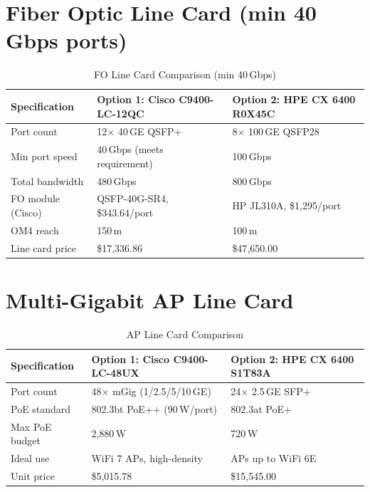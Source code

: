 \documentclass[12pt,a4paper]{report}
\begin{document}
\section{Fiber Optic Line Card (min 40\,Gbps ports)}

\begin{table}[H]
  \centering
  \caption{FO Line Card Comparison (min 40\,Gbps)}
  \label{tab:fo_lc_compare}
  \begin{tabular}{L{3.8cm} L{5.2cm} L{5.2cm}}
    \toprule
    \textbf{Specification} & \textbf{Option 1: Cisco C9400-LC-12QC} & \textbf{Option 2: HPE CX 6400 R0X45C} \\
    \midrule
    Port count             & 12$\times$ 40\,GE QSFP+           & 8$\times$ 100\,GE QSFP28 \\
    Min port speed         & 40\,Gbps (meets requirement)       & 100\,Gbps \\
    Total bandwidth        & 480\,Gbps                          & 800\,Gbps \\
    FO module (Cisco)      & QSFP-40G-SR4, \$343.64/port        & HP JL310A, \$1{,}295/port \\
    OM4 reach              & 150\,m                             & 100\,m \\
    Line card price  & \$17{,}336.86                      & \$47{,}650.00 \\
    \bottomrule
  \end{tabular}
\end{table}

\section{Multi-Gigabit AP Line Card}

\begin{table}[H]
  \centering
  \caption{AP Line Card Comparison}
  \label{tab:ap_lc_compare}
  \begin{tabular}{L{3.8cm} L{5.2cm} L{5.2cm}}
    \toprule
    \textbf{Specification} & \textbf{Option 1: Cisco C9400-LC-48UX} & \textbf{Option 2: HPE CX 6400 S1T83A} \\
    \midrule
    Port count             & 48$\times$ mGig (1/2.5/5/10\,GE)  & 24$\times$ 2.5\,GE SFP+ \\
    PoE standard           & 802.3bt PoE++ (90\,W/port)         & 802.3at PoE+ \\
    Max PoE budget         & 2{,}880\,W                         & 720\,W \\
    Ideal use              & WiFi 7 APs, high-density           & APs up to WiFi 6E \\
    Unit price       & \$5{,}015.78                       & \$15{,}545.00 \\
    \bottomrule
  \end{tabular}
\end{table}
\end{document}

